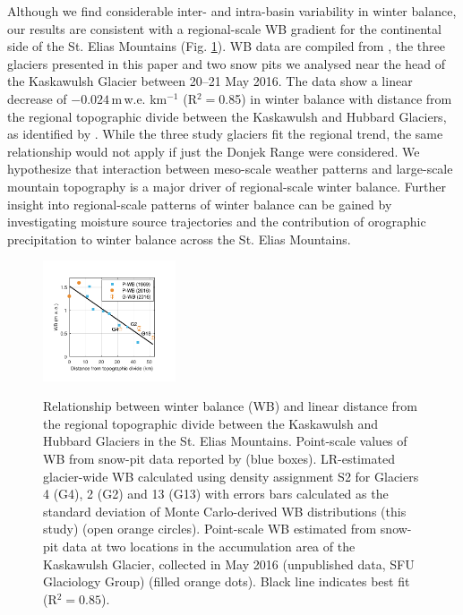 \documentclass[twocolumn, letterpaper]{igs}
\begin{document}
Although we find considerable inter- and intra-basin variability in winter balance, our results are consistent with a regional-scale WB gradient for the continental side of the St. Elias Mountains (Fig. \ref{fig:AccumGrad}). WB data are compiled from \cite{Taylor1969}, the three glaciers presented in this paper and two snow pits we analysed near the head of the Kaskawulsh Glacier between 20--21 May 2016. The data show a linear decrease of $-0.024$\,m\,w.e. km$^{-1}$ (R$^2=$0.85) in winter balance with distance from the regional topographic divide between the Kaskawulsh and Hubbard Glaciers, as identified by \cite{Taylor1969}. While the three study glaciers fit the regional trend, the same relationship would not apply if just the Donjek Range were considered. We hypothesize that interaction between meso-scale weather patterns and large-scale mountain topography is a major driver of regional-scale winter balance. Further insight into regional-scale patterns of winter balance can be gained by investigating moisture source trajectories and the contribution of orographic precipitation to winter balance across the St. Elias Mountains. 

\begin{figure}
	\centering
	\includegraphics[width =0.35\textwidth]{AccumGrad.pdf}\\
	\caption{Relationship between winter balance (WB) and linear distance from the regional topographic divide between the Kaskawulsh and Hubbard Glaciers in the St. Elias Mountains. Point-scale values of WB from snow-pit data reported by \cite{Taylor1969} (blue boxes). LR-estimated glacier-wide WB calculated using density assignment S2 for Glaciers 4 (G4), 2 (G2) and 13 (G13) with errors bars calculated as the standard deviation of Monte Carlo-derived WB distributions (this study) (open orange circles). Point-scale WB estimated from snow-pit data at two locations in the accumulation area of the Kaskawulsh Glacier, collected in May 2016 (unpublished data, SFU Glaciology Group) (filled orange dots). Black line indicates best fit (R$^2=0.85$).}
	\label{fig:AccumGrad}
\end{figure}
\end{document}
